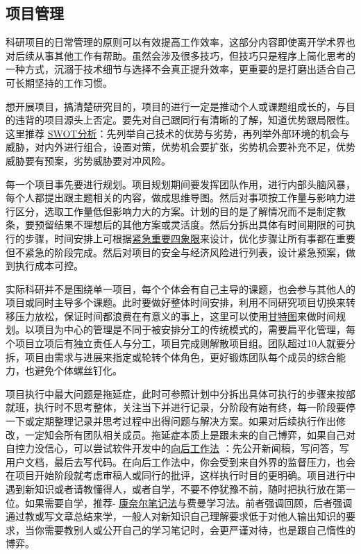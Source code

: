 \documentclass[]{tufte-book}
\begin{document}
\hypertarget{ux9879ux76eeux7ba1ux7406}{%
\subsection{项目管理}\label{ux9879ux76eeux7ba1ux7406}}

科研项目的日常管理的原则可以有效提高工作效率，这部分内容即使离开学术界也对后续从事其他工作有帮助。虽然会涉及很多技巧，但技巧只是程序上简化思考的一种方式，沉溺于技术细节与选择不会真正提升效率，更重要的是打磨出适合自己可长期坚持的工作习惯。

想开展项目，搞清楚研究目的，项目的进行一定是推动个人或课题组成长的，与目的违背的项目源头上否定。要先对自己跟同行有清晰的了解，知道优势跟局限性。这里推荐 \href{https://zh.wikipedia.org/wiki/\%E5\%BC\%B7\%E5\%BC\%B1\%E5\%8D\%B1\%E6\%A9\%9F\%E5\%88\%86\%E6\%9E\%90}{SWOT分析}：先列举自己技术的优势与劣势，再列举外部环境的机会与威胁，对内外进行组合，设置对策，优势机会要扩张，劣势机会要补充不足，优势威胁要有预案，劣势威胁要对冲风险。

每一个项目事先要进行规划。项目规划期间要发挥团队作用，进行内部头脑风暴，每个人都提出跟主题相关的内容，做成思维导图。然后对事项按工作量与影响力进行区分，选取工作量低但影响力大的方案。计划的目的是了解情况而不是制定教条，要预留结果不理想后的其他方案或灵活度。然后分拆出具体有时间期限的可执行的步骤，时间安排上可根据\href{https://wiki.mbalib.com/wiki/\%E6\%97\%B6\%E9\%97\%B4\%E2\%80\%9C\%E5\%9B\%9B\%E8\%B1\%A1\%E9\%99\%90\%E2\%80\%9D\%E6\%B3\%95}{紧急重要四象限}来设计，优化步骤让所有事都在重要但不紧急的阶段完成。然后对项目的安全与经济风险进行列表，设计紧急预案，做到执行成本可控。

实际科研并不是围绕单一项目，每个个体会有自己主导的课题，也会参与其他人的项目或同时主导多个课题。此时要做好整体时间安排，利用不同研究项目切换来转移压力放松，保证时间都浪费在有意义的事上，这里可以使用\href{https://zh.wikipedia.org/wiki/\%E7\%94\%98\%E7\%89\%B9\%E5\%9B\%BE}{甘特图}来做时间规划。以项目为中心的管理是不同于被安排分工的传统模式的，需要扁平化管理，每个项目立项后有独立责任人与分工，项目完成则解散项目组。团队超过10人就要分拆，项目由需求与进展来指定或轮转个体角色，更好锻炼团队每个成员的综合能力，也避免个体螺丝钉化。

项目执行中最大问题是拖延症，此时可参照计划中分拆出具体可执行的步骤来按部就班，执行时不思考整体，关注当下并进行记录，分阶段有始有终，每一阶段要停一下或定期整理记录并思考过程中出得问题与解决方案。如果对后续执行作出修改，一定知会所有团队相关成员。拖延症本质上是跟未来的自己博弈，如果自己对自控力没信心，可以尝试软件开发中的\href{https://www.allthingsdistributed.com/2006/11/working_backwards.html}{向后工作法} ：先公开新闻稿，写问答，写用户文档，最后去写代码。在向后工作法中，你会受到来自外界的监督压力，也会在项目开始阶段就考虑审稿人或同行的批评，这样执行时目的更明确。项目进行中遇到新知识或者请教懂得人，或者自学，不要不停犹豫不前，随时把执行放在第一位。如果需要自学，推荐- \href{https://zh.wikipedia.org/wiki/\%E5\%BA\%B7\%E5\%A5\%88\%E5\%B0\%94\%E7\%AC\%94\%E8\%AE\%B0\%E6\%B3\%95}{康奈尔笔记法}与费曼学习法。前者强调回顾，后者强调通过教或写文章总结来学，一般人对新知识自己理解要求低于对他人输出知识的要求，当你需要教别人或公开自己的学习笔记时，会更严谨对待，也是跟自己惰性的博弈。
\end{document}
